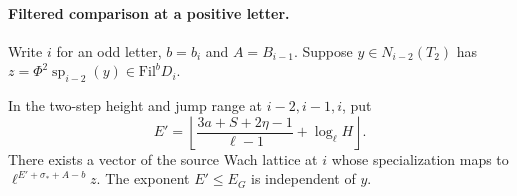 \paragraph{Filtered comparison at a positive letter.}
\label{par:thick-filtered-comparison}
Write \(i\) for an odd letter, \(b=b_i\) and \(A=B_{i-1}\).
Suppose \(y\in N_{i-2}(T_2)\) has
\(z=\Phi^2\operatorname{sp}_{i-2}(y)\in\mathrm{Fil}^bD_i\).
\begin{proposition}
In the two-step height and jump range at \(i-2,i-1,i\), put
\[
 E'=\left\lfloor\frac{3a+S+2\eta-1}{\ell-1}
                         +\log_\ell H\right\rfloor .
\]
There exists a vector of the source Wach lattice at \(i\) whose
specialization maps to \(\ell^{E'+\sigma_*+A-b}z\).
The exponent \(E'\le E_G\) is independent of \(y\).
\end{proposition}
